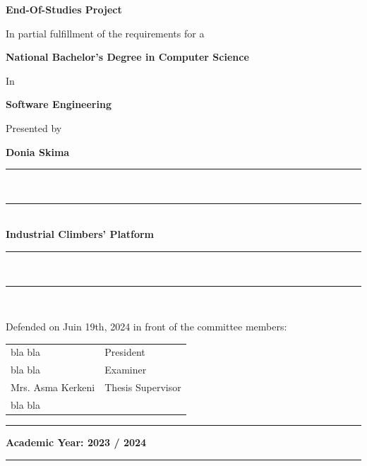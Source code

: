 \begin{titlepage}
\begin{center}
        \vspace{2cm}

        \Huge\textbf{End-Of-Studies Project}

        \vspace{1.5cm}

        \normalsize In partial fulfillment of the requirements for a

        \Large\textbf{National Bachelor's Degree in Computer Science        }

        \normalsize In

        \Large\textbf{Software Engineering}

        \normalsize Presented by

        \large{\textbf{Donia Skima}}
        \vspace{0.5cm}

        \rule[5pt]{0.5\textwidth}{0.5px}\\
        \vspace{-16px}
        \rule[10pt]{0.5\textwidth}{2.5px} \\
        \LARGE{\textbf{Industrial Climbers' Platform        }} \\
        \rule[5pt]{0.5\textwidth}{0.5px}\\
        \vspace{-15px}
        \rule[10pt]{0.5\textwidth}{2.5px} \\


        \vspace{1cm}

        \small Defended on Juin 19th, 2024 in front of the committee members:

        \renewcommand\arraystretch{1}
        \begin{tabular}{m{} l }
            bla bla  & President               \\
            bla bla   & Examiner                \\
            Mrs. Asma Kerkeni  & Thesis Supervisor       \\
            bla bla
        \end{tabular}
    \end{center}
    \vfill
    \centering
    \rule[0.5px]{30px}{0.5px} \space \footnotesize \textbf{Academic Year: 2023 / 2024} \space \rule[0.5px]{30px}{0.5px}
\end{titlepage}
\cleardoublepage